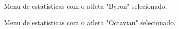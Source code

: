 \begin{figure}[h]
	\begin{center}
	\end{center}
	\caption{Menu de estatísticas com o atleta "Byron" selecionado.}\label{fig:gamestatslist2}
\end{figure}

\begin{figure}[h]
	\begin{center}
	\end{center}
	\caption{Menu de estatísticas com o atleta "Octavian" selecionado.}\label{fig:gamestatslist}
\end{figure}

